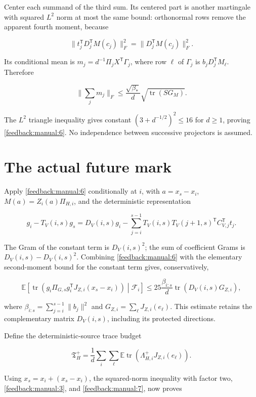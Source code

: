 \documentclass[11pt,oneside,openany,a4paper]{book}
\numberwithin{equation}{chapter}
\theoremstyle{definition}
\theoremstyle{remark}
\begin{document}
Center each summand of the third sum. Its centered part is another martingale with squared \(L^2\) norm at most the same bound: orthonormal rows remove the apparent fourth moment, because

\[
\|t_j^{\mathsf T}D_j^{\mathsf T}M(c_j)\|_F^2
=\|D_j^{\mathsf T}M(c_j)\|_F^2.
\]

Its conditional mean is \(m_j=d^{-1}\Pi_jX^{\mathsf T}\Gamma_j\), where row \(\ell\) of \(\Gamma_j\) is \(b_jD_j^{\mathsf T}M_\ell\). Therefore

\[
\Big\|\sum_jm_j\Big\|_F
\le\frac{\sqrt{\beta_*}}d\sqrt{\operatorname{tr}(SG_M)}.
\]

The \(L^2\) triangle inequality gives constant \((3+d^{-1/2})^2\le16\) for \(d\ge1\), proving \eqref{feedback:manual:6}. No independence between successive projectors is assumed.

\section{The actual future mark}\label{feedback:the-actual-future-mark}

Apply \eqref{feedback:manual:6} conditionally at \(i\), with \(a=x_s-x_i\), \(M(a)=Z_i(a)\Pi_{H,i}\), and the deterministic representation

\[
g_i-T_V(i,s)g_s
=D_V(i,s)g_i-\sum_{j=i}^{s-1}T_V(i,s)T_V(j+1,s)^{\mathsf T}C_{V,j}^{\mathsf T}t_j.
\]

The Gram of the constant term is \(D_V(i,s)^2\); the sum of coefficient Grams is \(D_V(i,s)-D_V(i,s)^2\). Combining \eqref{feedback:manual:6} with the elementary second-moment bound for the constant term gives, conservatively,

\[
\boxed{\displaystyle
\mathbb E\!\left[\operatorname{tr}\!\left(g_i\Pi_{G,s}g_i^{\mathsf T}J_{Z,i}(x_s-x_i)\right)\middle|\mathcal F_i\right]
\le25\frac{\beta_{i:s}}d\operatorname{tr}\!\left(D_V(i,s)G_{Z,i}\right),}\tag{\thechapter.7}\label{feedback:manual:7}
\]

where \(\beta_{i:s}=\sum_{j=i}^{s-1}\|b_j\|^2\) and \(G_{Z,i}=\sum_\ell J_{Z,i}(e_\ell)\). This estimate retains the complementary matrix \(D_V(i,s)\), including its protected directions.

Define the deterministic-source trace budget

\[
\mathfrak T_H^+=\frac1d\sum_i\sum_\ell\mathbb E\operatorname{tr}(\Lambda^+_{H,i}J_{Z,i}(e_\ell)).
\]

Using \(x_s=x_i+(x_s-x_i)\), the squared-norm inequality with factor two, \eqref{feedback:manual:3}, and \eqref{feedback:manual:7}, now proves
\end{document}
